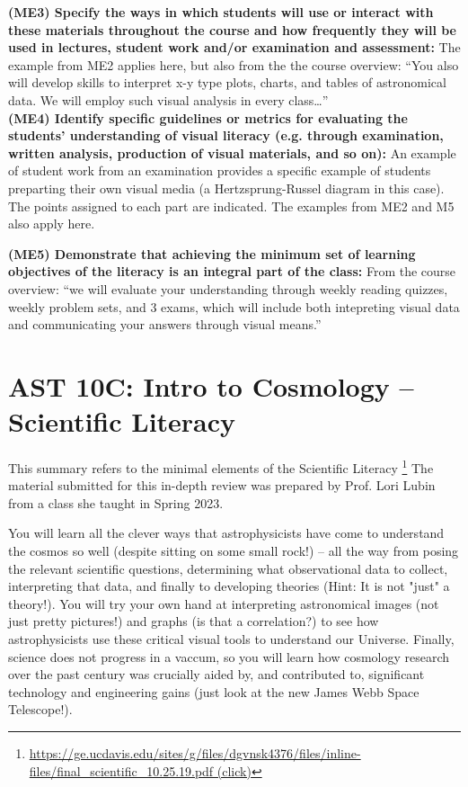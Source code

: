 \documentclass[12pt]{article}
\begin{document}
{\bf (ME3) Specify the ways in which students will use or interact with these materials
throughout the course and how frequently they will be used in lectures, student
work and/or examination and assessment:} The example from ME2 applies here, but also from the the course overview:  ``You also will develop skills to interpret x-y type plots, charts, and tables of astronomical data.  We will employ such visual analysis in every class\ldots''\\[1pt]

{\bf (ME4) Identify specific guidelines or metrics for evaluating the students’
understanding of visual literacy (e.g. through examination, written analysis,
production of visual materials, and so on):}
An example of student work from an examination provides a specific
example of students preparting their own visual media (a
Hertzsprung-Russel diagram in this case).  The points assigned to each
part are indicated.  The examples from ME2 and M5 also apply here.

{\bf (ME5) Demonstrate that achieving the minimum set of learning objectives of the
literacy is an integral part of the class:} From the course overview:  ``we will evaluate your understanding through weekly reading quizzes, weekly problem sets, and 3 exams, which will include both intepreting visual data and communicating your answers through visual means.''\\[1pt]

\newpage
\section{AST 10C: Intro to Cosmology -- Scientific Literacy}

This summary refers to the minimal elements of the Scientific Literacy \footnote{
\href{https://ge.ucdavis.edu/sites/g/files/dgvnsk4376/files/inline-files/final_scientific_10.25.19.pdf}{https://ge.ucdavis.edu/sites/g/files/dgvnsk4376/files/inline-files/final\_scientific\_10.25.19.pdf (click)}}
The material submitted for this in-depth review was prepared by Prof. Lori Lubin
from a class she taught in Spring 2023.

You will learn all the clever ways that astrophysicists have come to understand the cosmos so well (despite sitting on some small rock!) -- all the way from posing the relevant scientific questions, determining what observational data to collect, interpreting that data, and finally to developing theories (Hint: It is not "just" a theory!). You will try your own hand at interpreting astronomical images (not just pretty pictures!) and graphs (is that a correlation?) to see how astrophysicists use these critical visual tools to understand our Universe. Finally, science does not progress in a vaccum, so you will learn how cosmology research over the past century was crucially aided by, and contributed to, significant technology and engineering gains (just look at the new James Webb Space Telescope!). 
\end{document}
